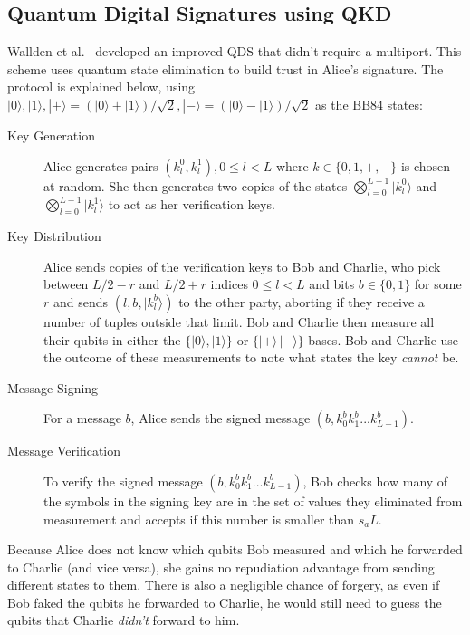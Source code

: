 \documentclass[%
 reprint,
 amsmath,amssymb,
 aps,
 pra,
]{revtex4-1}
\begin{document}
\subsection{Quantum Digital Signatures using QKD}
\label{ssec:qds-using-qkd}

Wallden et al.\ \cite{PhysRevA.91.042304} developed an improved QDS that didn't require a multiport. This scheme uses quantum state elimination \cite{PhysRevA.89.022336} to build trust in Alice's signature. The protocol is explained below, using $|0\rangle, |1\rangle, |+\rangle = (|0\rangle + |1\rangle)/\sqrt{2}, |-\rangle = (|0\rangle - |1\rangle)/\sqrt{2}$ as the BB84 \cite{BB84} states:

\begin{description}
\item[Key Generation]Alice generates pairs $(k^0_l, k^1_l), 0 \leq l < L$ where $k \in \{0, 1, +, -\}$ is chosen at random. She then generates two copies of the states $\bigotimes_{l=0}^{L-1}|k^0_l\rangle$ and $\bigotimes_{l=0}^{L-1}|k^1_l\rangle$ to act as her verification keys.
\item[Key Distribution]Alice sends copies of the verification keys to Bob and Charlie, who pick between $L/2-r$ and $L/2+r$ indices $0 \leq l < L$ and bits $b \in \{0, 1\}$ for some $r$ and sends $(l, b, |k^b_l\rangle)$ to the other party, aborting if they receive a number of tuples outside that limit. Bob and Charlie then measure all their qubits in either the $\{|0\rangle, |1\rangle\}$ or $\{|+\rangle\, |-\rangle\}$ bases. Bob and Charlie use the outcome of these measurements to note what states the key \textit{cannot} be.
\item[Message Signing]For a message $b$, Alice sends the signed message $(b, k^b_0k^b_1...k^b_{L-1})$.
\item[Message Verification]To verify the signed message $(b, k^b_0k^b_1...k^b_{L-1})$, Bob checks how many of the symbols in the signing key are in the set of values they eliminated from measurement and accepts if this number is smaller than $s_aL$.
\end{description}

Because Alice does not know which qubits Bob measured and which he forwarded to Charlie (and vice versa), she gains no repudiation advantage from sending different states to them. There is also a negligible chance of forgery, as even if Bob faked the qubits he forwarded to Charlie, he would still need to guess the qubits that Charlie \textit{didn't} forward to him.
\end{document}
